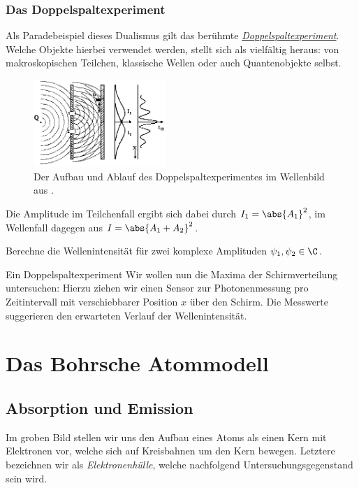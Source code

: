 \documentclass{subfiles}
\begin{document}
    \subsubsection*{Das Doppelspaltexperiment}
        Als Paradebeispiel dieses Dualismus gilt das berühmte \href{https://de.wikipedia.org/wiki/Doppelspaltexperiment}{\emph{Doppelspaltexperiment}}. Welche Objekte hierbei verwendet werden, stellt sich als vielfältig heraus: von makroskopischen Teilchen, klassische Wellen oder auch Quantenobjekte selbst. 
        \begin{figure}[H]
            \centering
            \includegraphics[width=5cm]{Bilddateien/Doppelspalt.png}
            \caption{Der Aufbau und Ablauf des Doppelspaltexperimentes im Wellenbild aus \cite{tubs:Doppelspalt}.}
        \end{figure}
        Die Amplitude im Teilchenfall ergibt sich dabei durch $I_1 = \abs{A_1}^2$, im Wellenfall dagegen aus $I = \abs{A_1+A_2}^2$. 
        \begin{Aufgabe}
            \nr{} Berechne die Wellenintensität für zwei komplexe Amplituden $\psi_1,\psi_2\in\C$. 
        \end{Aufgabe}
        \begin{Experiment}{Ein Doppelspaltexperiment}
            Wir wollen nun die Maxima der Schirmverteilung untersuchen: Hierzu ziehen wir einen Sensor zur Photonenmessung pro Zeitintervall mit verschiebbarer Position $x$ über den Schirm. Die Messwerte suggerieren den erwarteten Verlauf der Wellenintensität.
        \end{Experiment}

    \section{Das Bohrsche Atommodell}
        \subsection{Absorption und Emission}
            Im groben Bild stellen wir uns den Aufbau eines Atoms als einen Kern mit Elektronen vor, welche sich auf Kreisbahnen um den Kern bewegen. Letztere bezeichnen wir als \emph{Elektronenhülle}, welche nachfolgend Untersuchungsgegenstand sein wird. 
\end{document}
